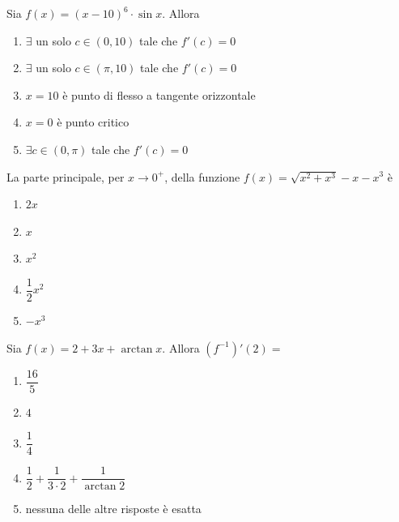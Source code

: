 \begin{quiz}
Sia $f(x)=(x-10)^6\cdot\sin x$. Allora
\begin{enumerate}
\item $\exists$ un solo $c\in(0,10)$ tale che $f\prime(c)=0$
\item $\exists$ un solo $c\in(\pi,10)$ tale che $f\prime(c)=0$
\item $x=10$ \`e punto di flesso a tangente orizzontale
\item $x=0$ \`e punto critico
\item $\exists c\in(0,\pi)$ tale che $f\prime(c)=0$
\end{enumerate}
\end{quiz}

\begin{quiz}
La parte principale, per $x\to0^+$, della funzione $f(x)=\sqrt{x^2+x^3}-x-x^3$ \`e
\begin{enumerate}
\item $2x$
\item $x$
\item $x^2$
\item $\dfrac12x^2$
\item $-x^3$
\end{enumerate}
\end{quiz}

\begin{quiz}
Sia $f(x)=2+3x+\arctan x$. Allora $(f^{-1})\prime(2)=$
\begin{enumerate}
\item $\dfrac{16}{5}$
\item $4$
\item $\dfrac14$
\item $\dfrac12+\dfrac1{3\cdot2}+\dfrac1{\arctan2}$
\item nessuna delle altre risposte \`e esatta
\end{enumerate}
\end{quiz}

